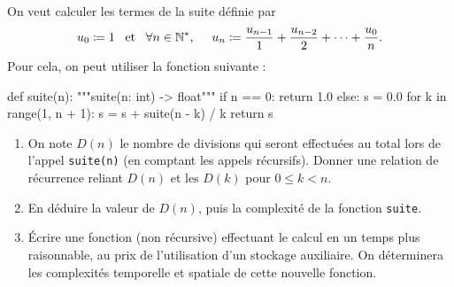 \documentclass{magnoliaold}
\begin{document}
  On veut calculer les termes de la suite définie par
  \[
    u_0 \coloneqq 1 \quad\!\text{et}\quad\! \forall n \in {\mathbb{N}^*},\quad \ u_{n} \coloneqq \frac{u_{n-1}}{1} + \frac{u_{n-2}}{2}
    + \dots + \frac{u_0}{n}.
  \]
  Pour cela, on peut utiliser la fonction suivante :
\begin{pythoncode}
def suite(n):
    """suite(n: int) -> float"""
    if n == 0:
        return 1.0
    else:
        s = 0.0
        for k in range(1, n + 1):
            s = s + suite(n - k) / k
        return s
\end{pythoncode}
  \begin{enumerate}
    \item On note $D(n)$ le nombre de divisions qui seront
          effectuées au total lors de l'appel \verb!suite(n)!
          (en comptant les appels récursifs).
          Donner une relation de récurrence reliant $D(n)$
          et les $D(k)$ pour $0 \leq k < n$.
    \item En déduire la valeur de $D(n)$, puis la complexité
          de la fonction \verb!suite!.
    \item Écrire une fonction (non récursive) effectuant le calcul
          en un temps plus raisonnable, au prix de l'utilisation d'un
          stockage auxiliaire. On déterminera les complexités temporelle
          et spatiale de cette nouvelle fonction.
  \end{enumerate}









	
\end{document}
